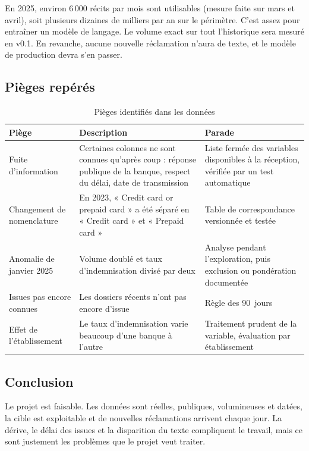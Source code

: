 \documentclass[11pt,a4paper]{article}
\begin{document}
En 2025, environ 6\,000 récits par mois sont utilisables (mesure faite sur mars et avril), soit plusieurs dizaines de milliers par an sur le périmètre. C'est assez pour entraîner un modèle de langage. Le volume exact sur tout l'historique sera mesuré en v0.1. En revanche, aucune nouvelle réclamation n'aura de texte, et le modèle de production devra s'en passer.

\subsection{Pièges repérés}

\begin{table}[H]
\centering\small
\begin{tabularx}{\linewidth}{@{}l Y Y@{}}
\toprule
Piège & Description & Parade \\
\midrule
Fuite d'information & Certaines colonnes ne sont connues qu'après coup : réponse publique de la banque, respect du délai, date de transmission & Liste fermée des variables disponibles à la réception, vérifiée par un test automatique \\
Changement de nomenclature & En 2023, « Credit card or prepaid card » a été séparé en « Credit card » et « Prepaid card » & Table de correspondance versionnée et testée \\
Anomalie de janvier 2025 & Volume doublé et taux d'indemnisation divisé par deux & Analyse pendant l'exploration, puis exclusion ou pondération documentée \\
Issues pas encore connues & Les dossiers récents n'ont pas encore d'issue & Règle des 90~jours \\
Effet de l'établissement & Le taux d'indemnisation varie beaucoup d'une banque à l'autre & Traitement prudent de la variable, évaluation par établissement \\
\bottomrule
\end{tabularx}
\caption{Pièges identifiés dans les données}
\end{table}

\subsection{Conclusion}

Le projet est faisable. Les données sont réelles, publiques, volumineuses et datées, la cible est exploitable et de nouvelles réclamations arrivent chaque jour. La dérive, le délai des issues et la disparition du texte compliquent le travail, mais ce sont justement les problèmes que le projet veut traiter.
\end{document}
